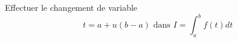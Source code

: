 Effectuer le changement de variable 
\begin{displaymath}
 t=a+u(b-a) \text{ dans } I=\int_a^bf(t)dt
\end{displaymath}
\bigskip\bigskip\bigskip